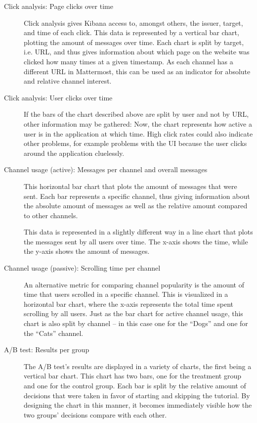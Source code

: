\begin{description}
\item[Click analysis: Page clicks over time]
Click analysis gives Kibana access to, amongst others, the issuer, target, and time of each click.
This data is represented by a vertical bar chart, plotting the amount of messages over time.
Each chart is split by target, i.e. URL, and thus gives information about which page on the website was clicked how many times at a given timestamp.
As each channel has a different URL in Mattermost, this can be used as an indicator for absolute and relative channel interest.

\item[Click analysis: User clicks over time]
If the bars of the chart described above are split by user and not by URL, other information may be gathered:
Now, the chart represents how active a user is in the application at which time.
High click rates could also indicate other problems, for example problems with the UI because the user clicks around the application cluelessly.

\item[Channel usage (active): Messages per channel and overall messages]  
This horizontal bar chart that plots the amount of messages that were sent.
Each bar represents a specific channel, thus giving information about the absolute amount of messages as well as the relative amount compared to other channels.

This data is represented in a slightly different way in a line chart that plots the messages sent by all users over time.
The x-axis shows the time, while the y-axis shows the amount of messages.

\item[Channel usage (passive): Scrolling time per channel]  
An alternative metric for comparing channel popularity is the amount of time that users scrolled in a specific channel.
This is visualized in a horizontal bar chart, where the x-axis represents the total time spent scrolling by all users.
Just as the bar chart for active channel usage, this chart is also split by channel -- in this case one for the ``Dogs'' and one for the ``Cats'' channel.

\item[A/B test: Results per group]
The A/B test's results are displayed in a variety of charts, the first being a vertical bar chart.
This chart has two bars, one for the treatment group and one for the control group.
Each bar is split by the relative amount of decisions that were taken in favor of starting and skipping the tutorial.
By designing the chart in this manner, it becomes immediately visible how the two groups' decisions compare with each other.


\end{description}
